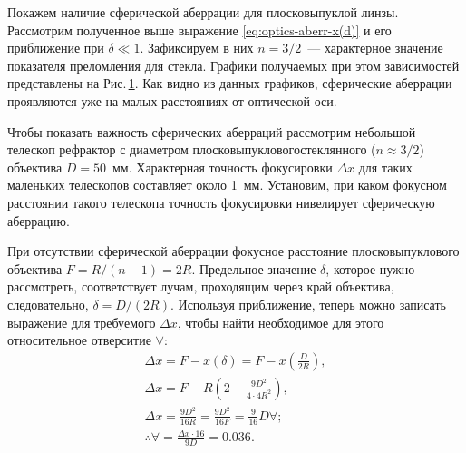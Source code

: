 \begin{figure}
	\centering
	\vspace{-.5pc}
	\caption{}
	\label{pic:sphere-aberrations-lens-plot}
\end{figure}
Покажем наличие сферической аберрации для плосковыпуклой линзы. Рассмотрим полученное выше выражение \eqref{eq:optics-aberr-x(d)} и его приближение при $\delta \ll 1$. Зафиксируем в них $n=3/2$~--- характерное значение показателя преломления для стекла. Графики получаемых при этом зависимостей представлены на Рис.\,\ref{pic:sphere-aberrations-lens-plot}. Как видно из данных графиков, сферические аберрации проявляются уже на малых расстояниях от оптической оси.

Чтобы показать важность сферических аберраций рассмотрим небольшой телескоп рефрактор с диаметром плосковы\-пук\-ло\-во\-го\linebreak стеклянного ($n \approx 3/2$) объектива $D = 50$~мм. Характерная точность фокусировки $\Delta x$ для таких маленьких телескопов составляет около 1~мм. Установим, при каком фокусном расстоянии такого телескопа точность фокусировки нивелирует сферическую аберрацию.

При отсутствии сферической аберрации фокусное расстояние плосковыпуклового объектива $F = R/(n-1) = 2R$. Предельное значение $\delta$, которое нужно рассмотреть, соответствует лучам, проходящим через край объектива, следовательно, $\delta = D/(2R)$. Используя приближение, теперь можно записать выражение для требуемого $\Delta x$, чтобы найти необходимое для этого относительное отверситие $\forall$:
\begin{gather*}
	\Delta x = F - x(\delta) = F - x\left( \frac{D}{2R} \right),\\
	\Delta x = F - R\left( 2 - \frac{9 D^2}{4 \cdot 4R^2} \right),\\
	\Delta x = \frac{9D^2}{16R} = \frac{9D^2}{16F} = \frac{9}{16} D \forall;\\
	\therefore \forall = \frac{\Delta x \cdot 16}{9D} = 0.036.
\end{gather*}

